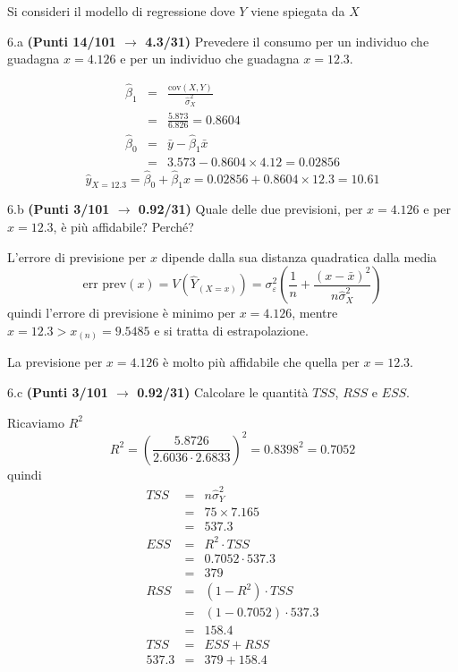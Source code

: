 \documentclass[
  11pt,
]{book}
\theoremstyle{mytheoremstyle}
\theoremstyle{mydefstyle}
\newenvironment{sol}
  {
  \begin{tcolorbox}[enhanced,breakable,arc=0.1mm,boxrule=1pt,colback=white,colframe=iblue,
  title=\bf \fontfamily{lmss}\selectfont \hspace{.5 cm} Soluzione,drop fuzzy shadow]

}{
\end{tcolorbox}
  }
\begin{document}
Si consideri il modello di regressione dove \(Y\) viene spiegata da \(X\)

6.a \textbf{(Punti 14/101 \(\rightarrow\) 4.3/31)} Prevedere il consumo per un individuo che guadagna \(x=4.126\) e
per un individuo che guadagna \(x=12.3\).

\begin{sol}
\begin{eqnarray*}
       \hat\beta_1 &=& \frac{\text{cov}(X,Y)}{\hat\sigma_X^2} \\
            &=& \frac{ 5.873 }{ 6.826 }  =  0.8604 \\
      \hat\beta_0 &=& \bar y - \hat\beta_1 \bar x\\
          &=&  3.573 - 0.8604 \times  4.12 = 0.02856 
      \end{eqnarray*}\[\hat y_{X= 12.3 }=\hat\beta_0+\hat\beta_1 x= 0.02856 + 0.8604 \times 12.3 = 10.61 \]

\end{sol}

6.b \textbf{(Punti 3/101 \(\rightarrow\) 0.92/31)} Quale delle due previsioni, per \(x=4.126\) e per \(x=12.3\),
è più affidabile? Perché?

\begin{sol}
L'errore di previsione per \(x\) dipende dalla sua distanza quadratica dalla media
\[
\text{err prev}(x)=V(\hat Y_{(X=x)})=\sigma_{\varepsilon}^{2}\left(\frac 1n+\frac{(x-\bar x)^2} {n \hat{\sigma}^{2}_{X}} \right)
\]
quindi l'errore di previsione è minimo per \(x=4.126\), mentre \(x=12.3>x_{(n)}=9.5485\)
e si tratta di estrapolazione.

La previsione per \(x=4.126\) è molto più affidabile che quella per \(x=12.3\).

\end{sol}

6.c \textbf{(Punti 3/101 \(\rightarrow\) 0.92/31)} Calcolare le quantità \(TSS\), \(RSS\) e \(ESS\).

\begin{sol}
Ricaviamo \(R^2\)
\[R^2=\left(\frac{5.8726}{2.6036\cdot 2.6833}\right)^2=0.8398^2=0.7052\]
quindi
\begin{eqnarray*}
   TSS &=& n\hat\sigma^2_Y\\
      &=& 75 \times 7.165 \\
      &=&  537.3 \\
   ESS &=& R^2\cdot TSS\\
      &=&  0.7052 \cdot 537.3 \\
      &=& 379 \\
   RSS &=& (1-R^2)\cdot TSS\\
      &=& (1- 0.7052 )\cdot 537.3 \\
      &=&  158.4 \\
   TSS &=& ESS+RSS \\ 537.3  &=&  379 + 158.4 
  \end{eqnarray*}

\end{sol}
\end{document}

